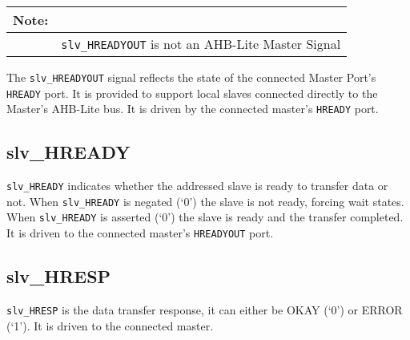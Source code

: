 \begin{longtable}[]{@{}|lp{12cm}@{}}
\textbf{Note:} & \\
\endhead
& \texttt{slv\_HREADYOUT} is not an AHB-Lite Master Signal\tabularnewline
\end{longtable}

The \texttt{slv\_HREADYOUT} signal reflects the state of the connected Master
Port's \texttt{HREADY} port. It is provided to support local slaves connected
directly to the Master's AHB-Lite bus. It is driven by the connected
master's \texttt{HREADY} port.

\subsection{slv\_HREADY}\label{slv_hready}

\texttt{slv\_HREADY} indicates whether the addressed slave is ready to transfer
data or not. When \texttt{slv\_HREADY} is negated (`0') the slave is not ready,
forcing wait states. When \texttt{slv\_HREADY} is asserted (`0') the slave is
ready and the transfer completed. It is driven to the connected master's
\texttt{HREADYOUT} port.

\subsection{slv\_HRESP}\label{slv_hresp}

\texttt{slv\_HRESP} is the data transfer response, it can either be OKAY (`0') or
ERROR (`1'). It is driven to the connected master.
